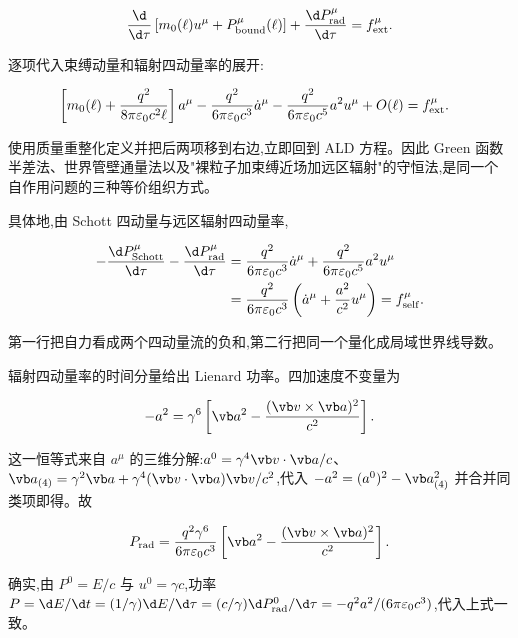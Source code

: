 \begin{equation*}
 {\d\over\d\tau}
 \left[m_0(\ell)u^\mu
 +P_{\mathrm{bound}}^\mu(\ell)\right]
 +{\d P_{\mathrm{rad}}^\mu\over\d\tau}
 =f_{\mathrm{ext}}^\mu.
\end{equation*}

逐项代入束缚动量和辐射四动量率的展开:

\begin{align*}
 &\left[m_0(\ell)
 +{q^2\over8\pi\varepsilon_0c^2\ell}\right]a^\mu
 -{q^2\over6\pi\varepsilon_0c^3}\dot a^\mu
 -{q^2\over6\pi\varepsilon_0c^5}a^2u^\mu
 +O(\ell)
 =f_{\mathrm{ext}}^\mu.
\end{align*}

使用质量重整化定义并把后两项移到右边,立即回到 ALD 方程。因此 Green 函数半差法、世界管壁通量法以及"裸粒子加束缚近场加远区辐射"的守恒法,是同一个自作用问题的三种等价组织方式。

具体地,由 Schott 四动量与远区辐射四动量率,

\begin{align*}
 -{\d P_{\mathrm{Schott}}^\mu\over\d\tau}
 -{\d P_{\mathrm{rad}}^\mu\over\d\tau}
 &={q^2\over6\pi\varepsilon_0c^3}\dot a^\mu
 +{q^2\over6\pi\varepsilon_0c^5}a^2u^\mu\\
 &={q^2\over6\pi\varepsilon_0c^3}
 \left(\dot a^\mu+{a^2\over c^2}u^\mu\right)
 =f_{\mathrm{self}}^\mu.
\end{align*}

第一行把自力看成两个四动量流的负和,第二行把同一个量化成局域世界线导数。

辐射四动量率的时间分量给出 Lienard 功率。四加速度不变量为

\begin{equation*}
 -a^2
 =\gamma^6
 \left[
 \vb a^2-{(\vb v\times\vb a)^2\over c^2}
 \right].
\end{equation*}

这一恒等式来自 $a^\mu$ 的三维分解:$a^0=\gamma^4\vb v\cdot\vb a/c$、$\vb a_{(4)}=\gamma^2\vb a+\gamma^4(\vb v\cdot\vb a)\vb v/c^2$,代入 $-a^2=(a^0)^2-\vb a_{(4)}^2$ 并合并同类项即得。故

\begin{equation*}
 P_{\mathrm{rad}}
 ={q^2\gamma^6\over6\pi\varepsilon_0c^3}
 \left[
 \vb a^2-{(\vb v\times\vb a)^2\over c^2}
 \right].
\end{equation*}

确实,由 $P^0=E/c$ 与 $u^0=\gamma c$,功率 $P=\d E/\d t=(1/\gamma)\d E/\d\tau=(c/\gamma)\d P_{\mathrm{rad}}^0/\d\tau=-q^2a^2/(6\pi\varepsilon_0c^3)$,代入上式一致。

